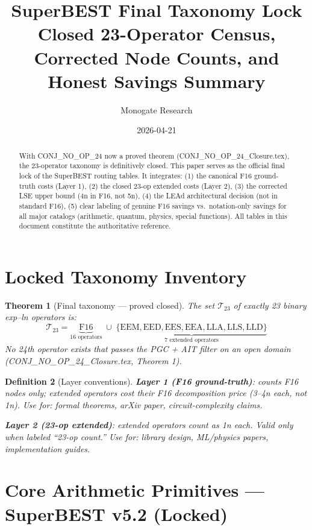 \documentclass[11pt]{article}
\title{SuperBEST Final Taxonomy Lock\\
Closed 23-Operator Census, Corrected Node Counts, and Honest Savings Summary}
\author{Monogate Research}
\date{2026-04-21}
\newtheorem{theorem}{Theorem}
\newtheorem{definition}[theorem]{Definition}
\begin{document}
\maketitle

\begin{abstract}
With CONJ\_NO\_OP\_24 now a proved theorem (CONJ\_NO\_OP\_24\_Closure.tex),
the 23-operator taxonomy is definitively closed.
This paper serves as the official final lock of the SuperBEST routing tables.
It integrates: (1) the canonical F16 ground-truth costs (Layer 1),
(2) the closed 23-op extended costs (Layer 2), (3) the corrected LSE upper bound
(4n in F16, not 5n), (4) the LEAd architectural decision (not in standard F16),
(5) clear labeling of genuine F16 savings vs.\ notation-only savings
for all major catalogs (arithmetic, quantum, physics, special functions).
All tables in this document constitute the authoritative reference.
\end{abstract}

\section{Locked Taxonomy Inventory}

\begin{theorem}[Final taxonomy — proved closed]
The set $\mathcal{T}_{23}$ of exactly 23 binary exp--ln operators is:
\[
\mathcal{T}_{23} = \underbrace{\mathrm{F16}}_{\text{16 operators}} \;\cup\;
\underbrace{\{\mathrm{EEM, EED, EES, EEA, LLA, LLS, LLD}\}}_{\text{7 extended operators}}
\]
No 24th operator exists that passes the PGC + AIT filter on an open domain
(CONJ\_NO\_OP\_24\_Closure.tex, Theorem 1).
\end{theorem}

\begin{definition}[Layer conventions]
\textbf{Layer 1 (F16 ground-truth)}: counts F16 nodes only; extended operators
cost their F16 decomposition price (3--4n each, not 1n).
Use for: formal theorems, arXiv paper, circuit-complexity claims.

\textbf{Layer 2 (23-op extended)}: extended operators count as 1n each.
Valid only when labeled ``23-op count.''
Use for: library design, ML/physics papers, implementation guides.
\end{definition}

\section{Core Arithmetic Primitives — SuperBEST v5.2 (Locked)}
\end{document}

